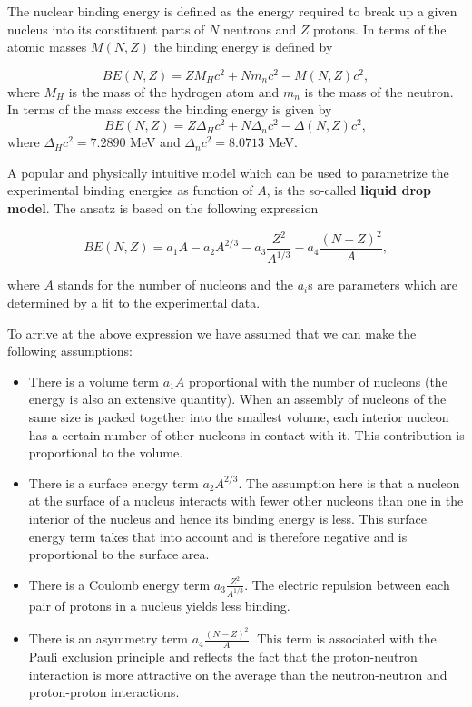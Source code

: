 \documentclass{beamer}
\begin{document}
\begin{frame}
The nuclear binding energy is defined as the energy required to break
up a given nucleus into its constituent parts of $N$ neutrons and $Z$
protons. In terms of the atomic masses $M(N, Z)$ the binding energy is
defined by

\[
BE(N, Z) = ZM_H c^2 + Nm_n c^2 - M(N, Z)c^2 ,
\]
where $M_H$ is the mass of the hydrogen atom and $m_n$ is the mass of the neutron.
In terms of the mass excess the binding energy is given by
\[
BE(N, Z) = Z\Delta_H c^2 + N\Delta_n c^2 -\Delta(N, Z)c^2 ,
\]
where $\Delta_H c^2 = 7.2890$ MeV and $\Delta_n c^2 = 8.0713$ MeV.

A popular and physically intuitive model which can be used to parametrize 
the experimental binding energies as function of $A$, is the so-called 
\textbf{liquid drop model}. The ansatz is based on the following expression

\[ 
BE(N,Z) = a_1A-a_2A^{2/3}-a_3\frac{Z^2}{A^{1/3}}-a_4\frac{(N-Z)^2}{A},
\]

where $A$ stands for the number of nucleons and the $a_i$s are parameters which are determined by a fit 
to the experimental data.  

To arrive at the above expression we have assumed that we can make the following assumptions:

\begin{itemize}
 \item There is a volume term $a_1A$ proportional with the number of nucleons (the energy is also an extensive quantity). When an assembly of nucleons of the same size is packed together into the smallest volume, each interior nucleon has a certain number of other nucleons in contact with it. This contribution is proportional to the volume.

 \item There is a surface energy term $a_2A^{2/3}$. The assumption here is that a nucleon at the surface of a nucleus interacts with fewer other nucleons than one in the interior of the nucleus and hence its binding energy is less. This surface energy term takes that into account and is therefore negative and is proportional to the surface area.

 \item There is a Coulomb energy term $a_3\frac{Z^2}{A^{1/3}}$. The electric repulsion between each pair of protons in a nucleus yields less binding. 

 \item There is an asymmetry term $a_4\frac{(N-Z)^2}{A}$. This term is associated with the Pauli exclusion principle and reflects the fact that the proton-neutron interaction is more attractive on the average than the neutron-neutron and proton-proton interactions.
\end{itemize}


\end{frame}
\end{document}
